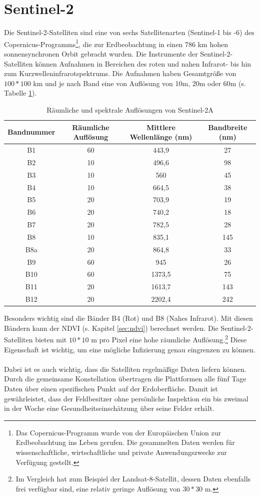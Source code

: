 \section{Sentinel-2}\label{sec:sentinel2}

Die Sentinel-2-Satelliten sind eine von sechs Satellitenarten (Sentinel-1 bis -6) des Copernicus-Programms\footnote{Das Copernicus-Programm wurde von der Europäischen Union zur Erdbeobachtung ins Leben gerufen. Die gesammelten Daten werden für wissenschaftliche, wirtschaftliche und private Anwendungszwecke zur Verfügung gestellt.\cite{ref:copernicus}}, die zur Erdbeobachtung in einen 786 km hohen sonnensynchronen Orbit gebracht wurden. Die Instrumente der Sentinel-2-Satelliten können Aufnahmen in Bereichen des roten und nahen Infrarot- bis hin zum Kurzwelleninfrarotspektrums. Die Aufnahmen haben Gesamtgröße von $100*100$ km und je nach Band eine von Auflösung von 10m, 20m oder 60m (s. Tabelle \ref{tab:resolutions}).

\begin{table}[h]
\begin{tabular}{c|c|c|c}
Bandnummer & Räumliche Auflösung & Mittlere Wellenlänge (nm) & Bandbreite (nm) \\
\hline
B1 & 60 & 443,9 & 27\\
B2 & 10 & 496,6 & 98\\
B3 & 10 & 560 & 45\\
B4 & 10 & 664,5 & 38\\
B5 & 20 & 703,9 & 19\\
B6 & 20 & 740,2 & 18\\
B7 & 20 & 782,5 & 28\\
B8 & 10 & 835,1 & 145\\
B8a & 20 & 864,8 & 33\\
B9 & 60 & 945 & 26\\
B10 & 60 & 1373,5 & 75\\
B11 & 20 & 1613,7 & 143\\
B12 & 20 & 2202,4 & 242\\
\end{tabular}
\caption{Räumliche und spektrale Auflösungen von Sentinel-2A\cite{ref:sentinel:radiores}}\label{tab:resolutions}
\end{table}
\noindent
Besonders wichtig sind die Bänder B4 (Rot) und B8 (Nahes Infrarot). Mit diesen Bändern kann der NDVI (s. Kapitel \ref{sec:ndvi}) berechnet werden.\cite{ref:sentinel:ndvi} Die Sentinel-2-Satelliten bieten mit $10*10$ m pro Pixel eine hohe räumliche Auflösung.\footnote{Im Vergleich hat zum Beispiel der Landsat-8-Satellit, dessen Daten ebenfalls frei verfügbar sind, eine relativ geringe Auflösung von $30*30$ m.} Diese Eigenschaft ist wichtig, um eine mögliche Infizierung genau eingrenzen zu können.\\\\
Dabei ist es auch wichtig, dass die Satelliten regelmäßige Daten liefern können. Durch die gemeinsame Konstellation übertragen die Plattformen alle fünf Tage Daten über einen spezifischen Punkt auf der Erdoberfläche.\cite{ref:sentinel:resolutions} Damit ist gewährleistet, dass der Feldbesitzer ohne persönliche Inspektion ein bis zweimal in der Woche eine Gesundheitseinschätzung über seine Felder erhält.

